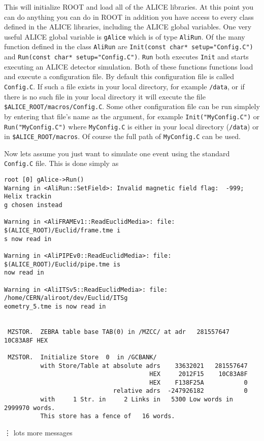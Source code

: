 This will initialize ROOT and load all of the ALICE libraries. At this point
you can do anything you can do in ROOT in addition you have access to every
class defined in the ALICE libraries, including the ALICE global variables. One
very useful ALICE global variable is \texttt{gAlice} which is of type
\texttt{AliRun}. Of the many function defined in the class \texttt{AliRun} are
\texttt{Init(const char* setup="Config.C")} and 
\texttt{Run(const char* setup="Config.C")}. \texttt{Run} both executes
\texttt{Init} and starts executing an ALICE detector simulation. Both of these
functions functions load and execute a configuration file. By default this
configuration file is called \texttt{Config.C}. If such a file exists in your
local directory, for example \texttt{/data}, or if there is no such file in
your local directory it will execute the file
\texttt{\$ALICE\_ROOT/macros/Config.C}. Some other configuration file can be
run simplely by entering that file's name as the argument, for example
\texttt{Init("MyConfig.C")} or \texttt{Run("MyConfig.C")} where
\texttt{MyConfig.C} is either in your local directory (\texttt{/data}) or in
\texttt{\$ALICE\_ROOT/macros}. Of course the full path of \texttt{MyConfig.C}
can be used.

Now lets assume you just want to simulate one event using the standard
\texttt{Config.C} file. This is done simply as
\scriptsize
\begin{verbatim}
root [0] gAlice->Run()
Warning in <AliRun::SetField>: Invalid magnetic field flag:  -999; Helix trackin
g chosen instead

Warning in <AliFRAMEv1::ReadEuclidMedia>: file: $(ALICE_ROOT)/Euclid/frame.tme i
s now read in

Warning in <AliPIPEv0::ReadEuclidMedia>: file: $(ALICE_ROOT)/Euclid/pipe.tme is 
now read in

Warning in <AliITSv5::ReadEuclidMedia>: file: /home/CERN/aliroot/dev/Euclid/ITSg
eometry_5.tme is now read in


 MZSTOR.  ZEBRA table base TAB(0) in /MZCC/ at adr   281557647    10C83A8F HEX

 MZSTOR.  Initialize Store  0  in /GCBANK/
          with Store/Table at absolute adrs    33632021   281557647
                                        HEX     2012F15    10C83A8F
                                        HEX    F138F25A           0
                              relative adrs  -247926182           0
          with     1 Str. in     2 Links in   5300 Low words in 2999970 words.
          This store has a fence of   16 words.
\end{verbatim}
\normalsize
\vdots
lots more messages

